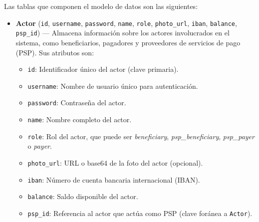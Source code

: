 Las tablas que componen el modelo de datos son las siguientes:

\begin{itemize}
  \item \textbf{Actor} (\texttt{id}, \texttt{username}, \texttt{password}, \texttt{name}, \texttt{role}, \texttt{photo\_url}, \texttt{iban}, \texttt{balance}, \texttt{psp\_id}) --- Almacena información sobre los actores involucrados en el sistema, como beneficiarios, pagadores y proveedores de servicios de pago (PSP). Sus atributos son:
    \begin{itemize}
      \item \texttt{id}: Identificador único del actor (clave primaria).
      \item \texttt{username}: Nombre de usuario único para autenticación.
      \item \texttt{password}: Contraseña del actor.
      \item \texttt{name}: Nombre completo del actor.
      \item \texttt{role}: Rol del actor, que puede ser \emph{beneficiary}, \emph{psp\_beneficiary}, \emph{psp\_payer} o \emph{payer}.
      \item \texttt{photo\_url}: URL o base64 de la foto del actor (opcional).
      \item \texttt{iban}: Número de cuenta bancaria internacional (IBAN).
      \item \texttt{balance}: Saldo disponible del actor.
      \item \texttt{psp\_id}: Referencia al actor que actúa como PSP (clave foránea a \texttt{Actor}).
    \end{itemize}


\end{itemize}
